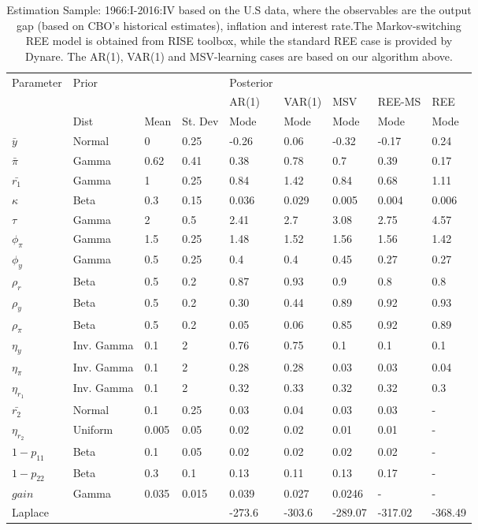 \documentclass[12pt,reqno]{article}
\numberwithin{equation}{section}
\begin{document}
\begin{table}[H]
\label{nkpc_estimation}
\caption{Estimation Sample: 1966:I-2016:IV based on the U.S data, where the observables are the output gap (based on CBO's historical estimates), inflation and interest rate.The Markov-switching REE model is obtained from RISE toolbox, while the standard REE case is provided by Dynare. The AR(1), VAR(1) and MSV-learning cases are based on our algorithm above. }

\vspace{3 mm}

\begin{tabular}{l||lll||l|l|l|ll}
Parameter & Prior &  &  & Posterior &  &  &  &  \\
 &  &  &  & AR(1) & VAR(1) & MSV & REE-MS & REE \\
\hline
\hline
 & Dist & Mean & St. Dev & Mode & Mode & Mode & Mode & Mode  \\
$\bar{y}$ & Normal & 0 & 0.25 & -0.26 & 0.06 & -0.32 & -0.17 & 0.24 \\
$\bar{\pi}$ & Gamma & 0.62 & 0.41 & 0.38 & 0.78 & 0.7 & 0.39 & 0.17 \\
$\bar{r_1}$ & Gamma & 1 & 0.25 & 0.84 & 1.42 & 0.84 & 0.68 & 1.11 \\
\hline
$\kappa$ & Beta & 0.3 & 0.15 & 0.036 & 0.029 & 0.005 & 0.004 & 0.006 \\
$\tau$ & Gamma & 2 & 0.5 & 2.41 & 2.7 & 3.08 & 2.75 & 4.57 \\
\hline
$\phi_{\pi}$ & Gamma & 1.5 & 0.25 & 1.48 & 1.52 & 1.56 & 1.56 & 1.42 \\
$\phi_y$ & Gamma & 0.5 & 0.25 & 0.4 & 0.4 & 0.45 & 0.27 & 0.27 \\
$\rho_r$ & Beta & 0.5 & 0.2 & 0.87 & 0.93 & 0.9 & 0.8 & 0.8 \\
\hline
$\rho_y$ & Beta & 0.5 & 0.2 & 0.30 & 0.44 & 0.89 & 0.92 & 0.93 \\
$\rho_{\pi}$ & Beta & 0.5 & 0.2 & 0.05 & 0.06 & 0.85 & 0.92 & 0.89 \\
$\eta_y$ & Inv. Gamma & 0.1 & 2 & 0.76 & 0.75 & 0.1 & 0.1 & 0.1 \\
$\eta_{\pi}$ & Inv. Gamma & 0.1 & 2 & 0.28 & 0.28 & 0.03 & 0.03 & 0.04 \\
$\eta_{r_1}$ & Inv. Gamma & 0.1 & 2 & 0.32 & 0.33 & 0.32 & 0.32 & 0.3 \\
\hline
$\bar{r_2}$ & Normal & 0.1 & 0.25 & 0.03 & 0.04 & 0.03 & 0.03 & - \\
$\eta_{r_2}$ & Uniform & 0.005 & 0.05 & 0.02 & 0.02 & 0.01 & 0.01 & - \\
$1-p_{11}$ & Beta & 0.1 & 0.05 & 0.02 & 0.02 & 0.02 & 0.02 & - \\
$1-p_{22}$ & Beta & 0.3 & 0.1 & 0.13 & 0.11 & 0.13 & 0.17 & - \\
$gain$ & Gamma & 0.035 & 0.015 & 0.039 & 0.027 & 0.0246 & - & - \\
 \hline
\hline
Laplace &  &  &  & -273.6 & -303.6 & -289.07  & -317.02 & -368.49
\end{tabular}
\end{table}
\end{document}
